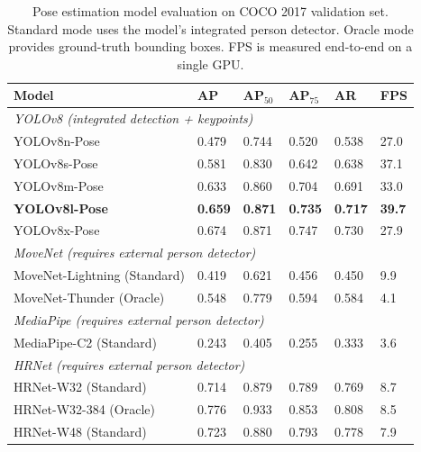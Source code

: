 \begin{table}[ht]
	\centering
	\footnotesize
	\begin{tabular}{llllll}
		\hline
		\textbf{Model}               & \textbf{AP}    & \textbf{AP$_{50}$} &
		\textbf{AP$_{75}$}           & \textbf{AR}    & \textbf{FPS}                              \\
		\hline
		\multicolumn{6}{l}{\textit{YOLOv8 (integrated detection + keypoints)}}                    \\
		YOLOv8n-Pose                 & 0.479          & 0.744              & 0.520 & 0.538 & 27.0 \\
		YOLOv8s-Pose                 & 0.581          & 0.830              & 0.642 & 0.638 & 37.1 \\
		YOLOv8m-Pose                 & 0.633          & 0.860              & 0.704 & 0.691 & 33.0 \\
		\textbf{YOLOv8l-Pose}        & \textbf{0.659} & \textbf{0.871}     &
		\textbf{0.735}               & \textbf{0.717} & \textbf{39.7}                             \\
		YOLOv8x-Pose                 & 0.674          & 0.871              & 0.747 & 0.730 & 27.9 \\
		\hline
		\multicolumn{6}{l}{\textit{MoveNet (requires external person detector)}}                  \\
		MoveNet-Lightning (Standard) & 0.419          & 0.621              & 0.456 & 0.450 & 9.9  \\
		MoveNet-Thunder (Oracle)     & 0.548          & 0.779              & 0.594 & 0.584 & 4.1  \\
		\hline
		\multicolumn{6}{l}{\textit{MediaPipe (requires external person detector)}}                \\
		MediaPipe-C2 (Standard)      & 0.243          & 0.405              & 0.255 & 0.333 & 3.6  \\
		\hline
		\multicolumn{6}{l}{\textit{HRNet (requires external person detector)}}                    \\
		HRNet-W32 (Standard)         & 0.714          & 0.879              & 0.789 & 0.769 & 8.7  \\
		HRNet-W32-384 (Oracle)       & 0.776          & 0.933              & 0.853 & 0.808 & 8.5  \\
		HRNet-W48 (Standard)         & 0.723          & 0.880              & 0.793 & 0.778 & 7.9  \\
		\hline
	\end{tabular}
	\caption{Pose estimation model evaluation on COCO 2017 validation set. Standard mode
		uses the model's integrated person detector. Oracle mode provides ground-truth
		bounding boxes. FPS is measured end-to-end on a single GPU.}
	\label{tab:pose_model_eval}
\end{table}

